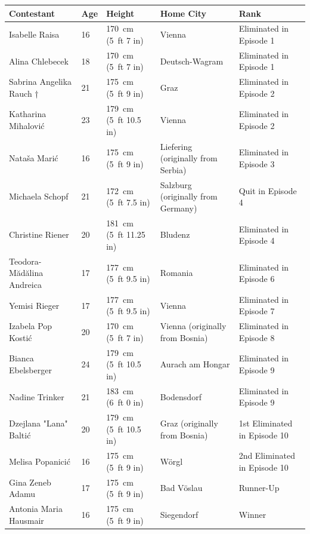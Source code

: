 \documentclass{article}
\begin{document}
\begin{tabular}{lllll}
\toprule
Contestant & Age & Height & Home City & Rank \\
\midrule
Isabelle Raisa & 16 & 170 cm (5 ft 7 in) & Vienna & Eliminated in Episode 1 \\
Alina Chlebecek & 18 & 170 cm (5 ft 7 in) & Deutsch-Wagram & Eliminated in Episode 1 \\
Sabrina Angelika Rauch † & 21 & 175 cm (5 ft 9 in) & Graz & Eliminated in Episode 2 \\
Katharina Mihalović & 23 & 179 cm (5 ft 10.5 in) & Vienna & Eliminated in Episode 2 \\
Nataša Marić & 16 & 175 cm (5 ft 9 in) & Liefering (originally from Serbia) & Eliminated in Episode 3 \\
Michaela Schopf & 21 & 172 cm (5 ft 7.5 in) & Salzburg (originally from Germany) & Quit in Episode 4 \\
Christine Riener & 20 & 181 cm (5 ft 11.25 in) & Bludenz & Eliminated in Episode 4 \\
Teodora-Mădălina Andreica & 17 & 177 cm (5 ft 9.5 in) & Romania & Eliminated in Episode 6 \\
Yemisi Rieger & 17 & 177 cm (5 ft 9.5 in) & Vienna & Eliminated in Episode 7 \\
Izabela Pop Kostić & 20 & 170 cm (5 ft 7 in) & Vienna (originally from Bosnia) & Eliminated in Episode 8 \\
Bianca Ebelsberger & 24 & 179 cm (5 ft 10.5 in) & Aurach am Hongar & Eliminated in Episode 9 \\
Nadine Trinker & 21 & 183 cm (6 ft 0 in) & Bodensdorf & Eliminated in Episode 9 \\
Dzejlana "Lana" Baltić & 20 & 179 cm (5 ft 10.5 in) & Graz (originally from Bosnia) & 1st Eliminated in Episode 10 \\
Melisa Popanicić & 16 & 175 cm (5 ft 9 in) & Wörgl & 2nd Eliminated in Episode 10 \\
Gina Zeneb Adamu & 17 & 175 cm (5 ft 9 in) & Bad Vöslau & Runner-Up \\
Antonia Maria Hausmair & 16 & 175 cm (5 ft 9 in) & Siegendorf & Winner \\
\bottomrule
\end{tabular}
\end{document}
